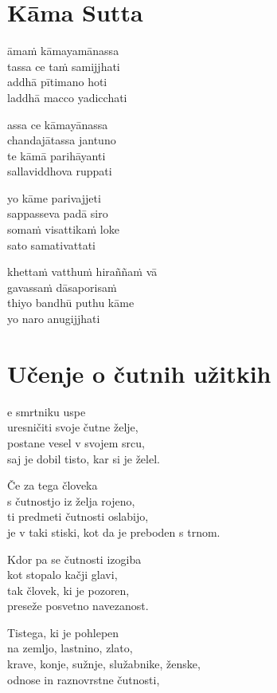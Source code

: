 

\cleartoverso
\chapter*{Kāma Sutta}

āmaṁ kāmayamānassa\\
tassa ce taṁ samijjhati\\
addhā pītimano hoti\\
laddhā macco yadicchati

assa ce kāmayānassa\\
chandajātassa jantuno\\
te kāmā parihāyanti\\
sallaviddhova ruppati

yo kāme parivajjeti\\
sappasseva padā siro\\
somaṁ visattikaṁ loke\\
sato samativattati

khettaṁ vatthuṁ hiraññaṁ vā\\
gavassaṁ dāsaporisaṁ\\
thiyo bandhū puthu kāme\\
yo naro anugijjhati


\cleartorecto
\chapter{Učenje o čutnih užitkih}

e smrtniku uspe\\
uresničiti svoje čutne želje,\\
postane vesel v svojem srcu,\\
saj je dobil tisto, kar si je želel.

Če za tega človeka\\
s čutnostjo iz želja rojeno,\\
ti predmeti čutnosti oslabijo,\\
je v taki stiski, kot da je preboden s trnom.

Kdor pa se čutnosti izogiba\\
kot stopalo kačji glavi,\\
tak človek, ki je pozoren,\\
preseže posvetno navezanost.

Tistega, ki je pohlepen\\
na zemljo, lastnino, zlato,\\
krave, konje, sužnje, služabnike, ženske,\\
odnose in raznovrstne čutnosti,

